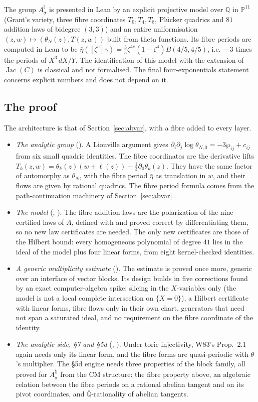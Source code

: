 \documentclass[11pt]{amsart}
\theoremstyle{definition}
\theoremstyle{remark}
\numberwithin{equation}{section}
\newcommand{\QQ}{\mathbb{Q}}
\newcommand{\PP}{\mathbb{P}}
\newcommand{\Qbar}{\overline{\mathbb{Q}}}
\begin{document}
The group $A_{\bar\sigma}^\natural$ is presented in Lean by an explicit projective model over $\QQ$ in $\PP^{11}$
(Grant's variety, three fibre coordinates $T_0,T_4,T_8$, Plücker quadrics and $81$ addition laws of bidegree $(3,3)$)
and an entire uniformisation $(z,w)\mapsto(\theta_N(z),T(z,w))$ built from theta functions. Its fibre periods are
computed in Lean to be $\bar\eta([\zeta^e]\gamma)=\frac35\zeta^{4e}(1-\zeta^4)B(4/5,4/5)$, i.e.\ $-3$ times the periods of
$X^3\,dX/Y$. The identification of this model with the extension of $\operatorname{Jac}(C)$ is classical and not
formalised. The final four-exponentials statement concerns explicit numbers and does not depend on it.

\subsection{The proof}
The architecture is that of Section~\ref{sec:abvar}, with a fibre added to every layer.
\begin{itemize}
\item \emph{The analytic group} (). A Liouville argument gives
$\partial_i\partial_j\log\theta_{N,0}=-3\wp_{ij}+c_{ij}$ from six small quadric identities. The fibre coordinates are
the derivative lifts $T_k(z,w)=\theta_k(z)(w+\ell(z))-\frac13\partial_0\theta_k(z)$. They have the same factor of
automorphy as $\theta_N$, with the fibre period $\bar\eta$ as translation in $w$, and their flows are given by rational
quadrics. The fibre period formula comes from the path-continuation machinery of Section~\ref{sec:abvar}.
\item \emph{The model} (, ). The fibre addition laws are the polarization of
the nine certified laws of $A$, defined with  and proved correct by differentiating them, so no new law
certificates are needed. The only new certificates are those of the Hilbert bound: every homogeneous polynomial of
degree $41$ lies in the ideal of the model plus four linear forms, from eight kernel-checked identities.
\item \emph{A generic multiplicity estimate} (). The estimate is proved once more, generic over an
interface  of vector blocks. Its design builds in five corrections found by an exact computer-algebra
spike: slicing in the $X$-variables only (the model is not a local complete intersection on $\{X=0\}$), a Hilbert
certificate with linear forms, fibre flows only in their own chart, generators that need not span a saturated
ideal, and no requirement on the fibre coordinate of the identity.
\item \emph{The analytic side, \S7 and \S5d} (, ). Under toric injectivity,
W83's Prop.~2.1 again needs only its linear form, and the fibre forms are quasi-periodic with $\theta$'s multiplier.
The \S5d engine needs three properties of the block family, all proved for $A_{\bar\sigma}^\natural$ from the CM
structure: the fibre property above, an algebraic relation between the fibre periods on a rational abelian tangent
and on its pivot coordinates, and $\Qbar$-rationality of abelian tangents.
\end{itemize}
\end{document}
